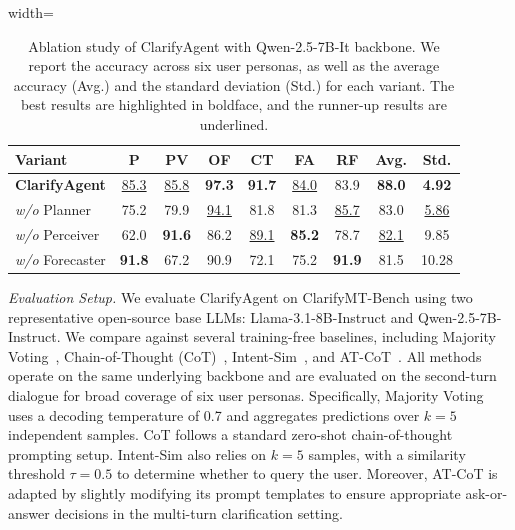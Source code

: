 \documentclass[sigconf]{acmart}
\newcommand{\model}{ClarifyAgent\xspace}
\begin{document}
\begin{table}[!t]
\centering
\caption{Ablation study of \model with Qwen-2.5-7B-It backbone. 
We report the accuracy across six user personas, as well as the average accuracy (Avg.) and the standard deviation (Std.) for each variant.
The best results are highlighted in boldface, and the runner-up results are underlined.
}
\label{tab:agentablation}
\begin{adjustbox}{width=\linewidth}
\begin{tabular}{lcccccccc}
\toprule
\textbf{Variant} & \textbf{P} & \textbf{PV} & \textbf{OF} & \textbf{CT} & \textbf{FA} & \textbf{RF} & \textbf{Avg.} & \textbf{Std.} \\
\midrule
\textbf{\model} & \underline{85.3} & \underline{85.8} & \textbf{97.3} & \textbf{91.7} & \underline{84.0} & {83.9} & \textbf{88.0} & \textbf{4.92} \\
\textit{w/o} Planner & 75.2 & 79.9 & \underline{94.1} & 81.8 & 81.3 & \underline{85.7} & 83.0 & \underline{5.86} \\
\textit{w/o} Perceiver & 62.0 & \textbf{91.6} & 86.2 & \underline{89.1} & \textbf{85.2} & 78.7 & \underline{82.1} & 9.85 \\
\textit{w/o} Forecaster & \textbf{91.8} & 67.2 & 90.9 & 72.1 & 75.2 & \textbf{91.9} & 81.5 & 10.28 \\
\bottomrule
\end{tabular}
\end{adjustbox}
\end{table}

\textit{Evaluation Setup.}
We evaluate \model on ClarifyMT-Bench using two representative open-source base LLMs: Llama-3.1-8B-Instruct and Qwen-2.5-7B-Instruct.
We compare against several training-free baselines, including Majority Voting~\cite{wangself}, Chain-of-Thought (CoT)~\cite{wei2022chain}, Intent-Sim~\cite{zhang2025clarify}, and AT-CoT~\cite{tang2025clarifying}.
All methods operate on the same underlying backbone and are evaluated on the second-turn dialogue for broad coverage of six user personas.
Specifically, Majority Voting uses a decoding temperature of 0.7 and aggregates predictions over $k{=}5$ independent samples.
CoT follows a standard zero-shot chain-of-thought prompting setup.
Intent-Sim also relies on $k{=}5$ samples, with a similarity threshold $\tau=0.5$  to determine whether to query the user.
Moreover, AT-CoT is adapted by slightly modifying its prompt templates to ensure appropriate ask-or-answer decisions in the multi-turn clarification setting.
\end{document}
